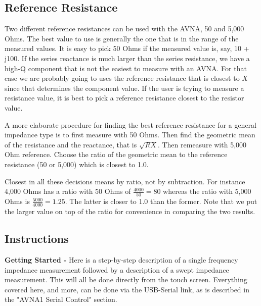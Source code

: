 \subsection{Reference Resistance}Two different reference resistances can be used with the AVNA, 50 and 5,000 Ohms. The best value to use is generally the one that is in the range of the measured values. It is easy to pick 50 Ohms if the measured value is, say, 10 + j100. If the series reactance is much larger than the series resistance, we have a high-Q component that is not the easiest to measure with an AVNA. For that case we are probably going to uses the reference resistance that is closest to \(X\) since that determines the component value. If the user is trying to measure a resistance value, it is best to pick a reference resistance closest to the resistor value.

A more elaborate procedure for finding the best reference resistance for a general impedance type is to first measure with 50 Ohms. Then find the geometric mean of the resistance and the reactance, that is \(\sqrt{R X}\). Then remeasure with 5,000 Ohm reference. Choose the ratio of the geometric mean to the reference resistance (50 or 5,000) which is closest to 1.0.

Closest in all these decisions means by ratio, not by subtraction. For instance 4,000 Ohms has a ratio with 50 Ohms of  \( \frac{4000}{50} = 80\) whereas the ratio with 5,000 Ohms is \( \frac{5000}{4000} = 1.25\). The latter is closer to 1.0 than the former.  Note that we put the larger value on top of the ratio for convenience in comparing the two results.
%
\subsection{Instructions}
\label{subsect:ZInstr}
\textbf{Getting Started - }Here is a step-by-step description of a single frequency impedance measurement followed by a description of a swept impedance measurement. This will all be done directly from the touch screen. Everything covered here, and more, can be done via the USB-Serial link, as is described in the "AVNA1 Serial Control" section.

